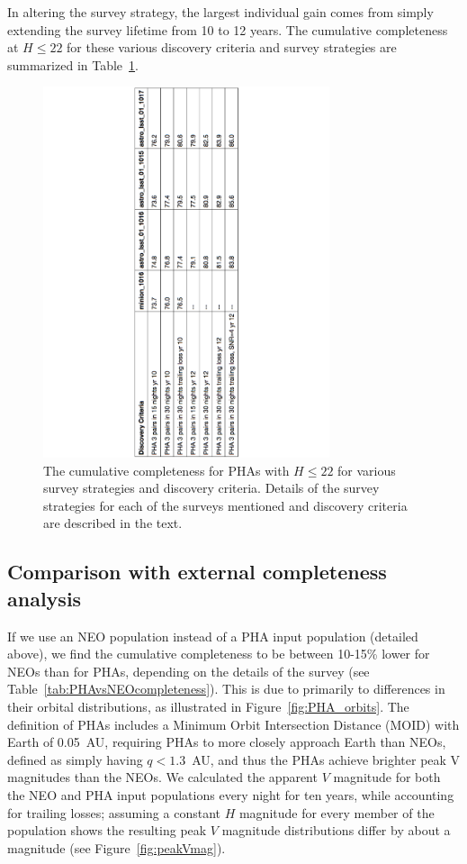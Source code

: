 In altering the survey strategy, the largest individual gain comes from simply extending the survey lifetime from 10 to 12 years. The cumulative completeness at $H\le22$ for these various discovery criteria and survey strategies are summarized in Table~\ref{tab:completeness}. 

\begin{figure}
\centering
\includegraphics[width=0.75\textwidth]{figures/PHA_cumulative_completeness}
\caption{The cumulative completeness for PHAs with $H\le22$ for various survey strategies and discovery criteria. Details of the survey strategies for each of the surveys mentioned and discovery criteria are described in the text.
\label{tab:completeness}}
\end{figure}


\subsection{Comparison with external completeness analysis}

If we use an NEO population instead of a PHA input population (detailed above), we find the cumulative completeness to be between 10-15\% lower for NEOs than for PHAs, depending on the details of the survey (see Table~\ref{tab:PHAvsNEOcompleteness}). This is due to primarily to differences in their orbital distributions, as illustrated in Figure~\ref{fig:PHA_orbits}. The definition of PHAs includes a Minimum Orbit Intersection Distance (MOID) with Earth of 0.05~AU, requiring PHAs to more closely approach Earth than NEOs, defined as simply having $q<1.3$~AU, and thus the PHAs achieve brighter peak V magnitudes than the NEOs. We calculated the apparent $V$ magnitude for both the NEO and PHA input populations every night for ten years, while accounting for trailing losses; assuming a constant $H$ magnitude for every member of the population shows the resulting peak $V$ magnitude distributions differ by about a magnitude (see Figure~\ref{fig:peakVmag}). 

